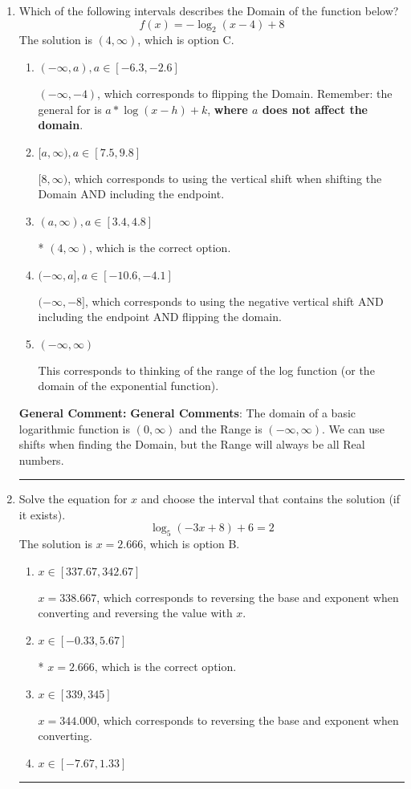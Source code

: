 \documentclass{extbook}[14pt]
\newcommand{\litem}[1]{\item #1

\rule{\textwidth}{0.4pt}}
\begin{document}
\begin{enumerate}\litem{
Which of the following intervals describes the Domain of the function below?
\[ f(x) = -\log_2{(x-4)}+8 \]The solution is \( (4, \infty) \), which is option C.\begin{enumerate}[label=\Alph*.]
\item \( (-\infty, a), a \in [-6.3, -2.6] \)

$(-\infty, -4)$, which corresponds to flipping the Domain. Remember: the general for is $a*\log(x-h)+k$, \textbf{where $a$ does not affect the domain}.
\item \( [a, \infty), a \in [7.5, 9.8] \)

$[8, \infty)$, which corresponds to using the vertical shift when shifting the Domain AND including the endpoint.
\item \( (a, \infty), a \in [3.4, 4.8] \)

* $(4, \infty)$, which is the correct option.
\item \( (-\infty, a], a \in [-10.6, -4.1] \)

$(-\infty, -8]$, which corresponds to using the negative vertical shift AND including the endpoint AND flipping the domain.
\item \( (-\infty, \infty) \)

This corresponds to thinking of the range of the log function (or the domain of the exponential function).
\end{enumerate}

\textbf{General Comment:} \textbf{General Comments}: The domain of a basic logarithmic function is $(0, \infty)$ and the Range is $(-\infty, \infty)$. We can use shifts when finding the Domain, but the Range will always be all Real numbers.
}
\litem{
Solve the equation for $x$ and choose the interval that contains the solution (if it exists).
\[ \log_{5}{(-3x+8)}+6 = 2 \]The solution is \( x = 2.666 \), which is option B.\begin{enumerate}[label=\Alph*.]
\item \( x \in [337.67, 342.67] \)

$x = 338.667$, which corresponds to reversing the base and exponent when converting and reversing the value with $x$.
\item \( x \in [-0.33, 5.67] \)

* $x = 2.666$, which is the correct option.
\item \( x \in [339, 345] \)

$x = 344.000$, which corresponds to reversing the base and exponent when converting.
\item \( x \in [-7.67, 1.33] \)


\end{enumerate}}
\end{enumerate}
\end{document}
